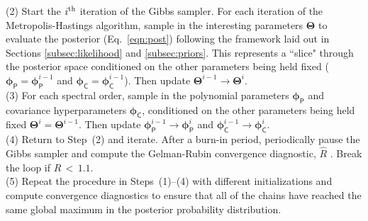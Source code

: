 \documentclass[iop,floatfix,numberedappendix,twocolappendix]{emulateapj}
\newcommand{\vT}{ {\bm \Theta}}
\newcommand{\vp}{ {\bm \phi}}
\newcommand{\cheb}{ \vp_{\mathsf{P}}}
\newcommand{\cov}{ \vp_{\mathsf{C}}}
\begin{document}
\noindent (2) Start the $i^{\rm th}$ iteration of the Gibbs sampler.  For
each iteration of the Metropolis-Hastings algorithm, sample in the interesting parameters $\vT$ to
evaluate the posterior (Eq.~\ref{eqn:post}) following the framework laid out in Sections
\ref{subsec:likelihood} and \ref{subsec:priors}.  This represents a ``slice" through the posterior
space conditioned on the other parameters being held fixed ($\cheb = \cheb^{i-1}$ and $\cov =
\cov^{i-1}$).  Then update $\vT^{i-1} \rightarrow \vT^i$. \\

\noindent (3) For each spectral order, sample in the polynomial parameters $\cheb$ and covariance
hyperparameters $\cov$, conditioned on the other parameters being held fixed $\vT^i = \vT^{i-1}$.
Then update $\cheb^{i-1} \rightarrow \cheb^i$ and $\cov^{i-1} \rightarrow \cov^i$. \\

\noindent (4) Return to Step~(2) and iterate.  After a burn-in period, periodically pause the Gibbs 
sampler and compute the Gelman-Rubin convergence diagnostic, $\hat{R}$ \citep[][their 
Eq.~11.4]{gelman13}.  Break the loop if $\hat{R} \, < \, 1.1$.  \\

\noindent (5) Repeat the procedure in Steps~(1)--(4) with different initializations and compute 
convergence diagnostics to ensure that all of the chains have reached the same global maximum in 
the posterior probability distribution. \\
\end{document}
